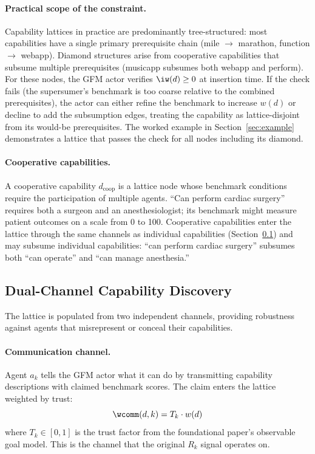 \paragraph{Practical scope of the constraint.} Capability lattices in practice
are predominantly tree-structured: most capabilities have a single primary
prerequisite chain (mile $\to$ marathon, function $\to$ webapp). Diamond
structures arise from cooperative capabilities that subsume multiple
prerequisites (musicapp subsumes both webapp and perform). For these nodes, the
GFM actor verifies $\iw(d) \geq 0$ at insertion time. If the check fails (the
supersumer's benchmark is too coarse relative to the combined prerequisites),
the actor can either refine the benchmark to increase $w(d)$ or decline to add
the subsumption edges, treating the capability as lattice-disjoint from its
would-be prerequisites. The worked example in Section~\ref{sec:example}
demonstrates a lattice that passes the check for all nodes including its
diamond.

\paragraph{Cooperative capabilities.} A cooperative capability $d_{\mathrm{coop}}$
is a lattice node whose benchmark conditions require the participation of
multiple agents. ``Can perform cardiac surgery'' requires both a surgeon and an
anesthesiologist; its benchmark might measure patient outcomes on a scale from
0 to 100. Cooperative capabilities enter the lattice through the same channels
as individual capabilities (Section~\ref{sec:dual_channel}) and may subsume
individual capabilities: ``can perform cardiac surgery'' subsumes both ``can
operate'' and ``can manage anesthesia.''


\subsection{Dual-Channel Capability Discovery}
\label{sec:dual_channel}

The lattice is populated from two independent channels, providing robustness
against agents that misrepresent or conceal their capabilities.

\paragraph{Communication channel.} Agent $a_k$ tells the GFM actor what it can
do by transmitting capability descriptions with claimed benchmark scores. The
claim enters the lattice weighted by trust:
\begin{equation}
\label{eq:w_comm}
\wcomm(d, k) = T_k \cdot w(d)
\end{equation}
where $T_k \in [0, 1]$ is the trust factor from the foundational paper's
observable goal model. This is the channel that the original $R_k$ signal
operates on.

